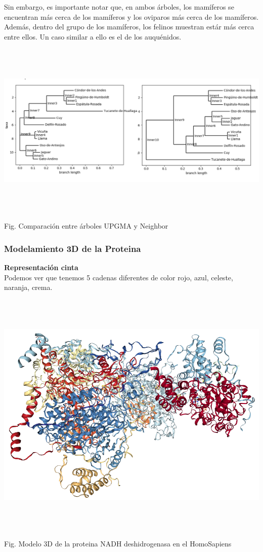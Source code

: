 \documentclass[a4paper]{article}
\begin{document}
Sin embargo, es importante notar que, en ambos árboles, los mamíferos se encuentran más cerca de los mamíferos y los oviparos más cerca de los mamíferos. Además, dentro del grupo de los mamíferos, los felinos muestran estár más cerca entre ellos. Un caso similar a ello es el de los auquénidos.

\begin{center}
	\includegraphics[width=15.5cm,height=8.5cm]{tree_comparation.png}
	
	Fig. Comparación entre árboles UPGMA y Neighbor
\end{center}
\subsubsection{Modelamiento 3D de la Proteina}

\noindent\textbf{Representación cinta}\\

\noindent Podemos ver que tenemos 5 cadenas diferentes de color rojo, azul, celeste, naranja, crema.
\begin{center}
	\includegraphics[width=16cm,height=12cm]{protein1.png}
	
	Fig. Modelo 3D de la proteina NADH deshidrogenasa en el HomoSapiens 
\end{center}
\end{document}
